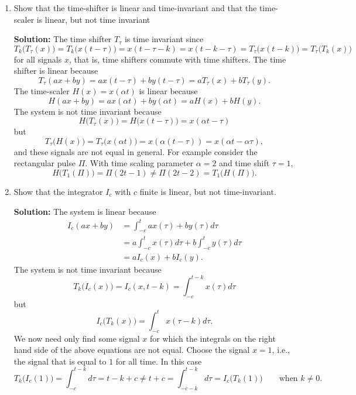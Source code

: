 \documentclass[11pt,a4paper]{book}
\theoremstyle{plain}
\numberwithin{equation}{section}
\newenvironment{solution}{\begin{footnotesize}\textbf{Solution:}}{\end{footnotesize}}
\newenvironment{excersizelist}{%
  \renewcommand*{\theenumi}{\thechapter.\arabic{enumi}}%
  \newcommand\itemadvanced{\stepcounter{enumi}\item[$\ast$\, \theenumi.]}
  \begin{enumerate}
}{%
  \end{enumerate}
}
\begin{document}
\begin{excersizelist}
\item Show that the time-shifter is linear and time-invariant and that the time-scaler is linear, but not time invariant
\begin{solution}
The time shifter $T_\tau$ is time invariant since
\[
T_k\big(T_\tau(x)\big) = T_k\big(x(t - \tau)\big) = x(t - \tau - k) = x(t - k - \tau) = T_\tau\big(x(t - k)\big) = T_\tau\big(T_k(x)\big) 
\]
for all signals $x$, that is, time shifters commute with time shifters.  The time shifter is linear because
\[
T_\tau(ax + by) = ax(t - \tau) + by(t - \tau) = a T_\tau(x) + b T_\tau(y).
\]
The time-scaler $H(x) = x(\alpha t)$ is linear because
\[
H(ax + by) = ax(\alpha t) + by(\alpha t) = aH(x) + b H(y).
\]
The system is not time invariant because
\[
H\big(T_\tau(x)\big) = H\big(x(t-\tau)\big) = x(\alpha t - \tau)
\]
but 
\[
T_\tau\big(H(x)\big) = T_\tau\big(x(\alpha t) \big) = x(\alpha(t - \tau)) = x( \alpha t - \alpha \tau ),
\]
and these signals are not equal in general.  For example consider the rectangular pulse $\Pi$.  With time scaling parameter $\alpha = 2$ and time shift $\tau = 1$,
\[
H\big(T_1(\Pi)\big) = \Pi( 2 t - 1 ) \neq \Pi( 2t - 2 ) = T_1\big(H(\Pi)\big).
\]
\end{solution}


\item Show that the integrator $I_c$ with $c$ finite is linear, but not time-invariant.
\begin{solution}
The system is linear because
\begin{align*}
I_c(ax + by) &= \int_{-c}^t ax(\tau) + b y(\tau) d\tau \\
&= a\int_{-c}^t x(\tau) d\tau + b \int_{-c}^t y(\tau) d\tau \\
&= a I_c(x)  + b I_c(y).
\end{align*}
The system is not time invariant because
\[
T_k\big(I_c(x)\big) = I_c(x,t-k) = \int_{-c}^{t-k} x(\tau) d\tau 
\]
but
\[
I_c\big(T_k(x)\big) = \int_{-c}^{t} x(\tau-k) d\tau.
\]
We now need only find some signal $x$ for which the integrals on the right hand side of the above equations are not equal.  Choose the signal $x = 1$, i.e., the signal that is equal to $1$ for all time.  In this case
\[
T_k\big(I_c(1)\big) = \int_{-c}^{t-k} d\tau =  t-k+c \neq t + c = \int_{-c-k}^{t-k} d\tau = I_c\big(T_k(1)\big) \qquad \text{when $k \neq 0$.}
\]
\end{solution}


\end{excersizelist}
\end{document}
